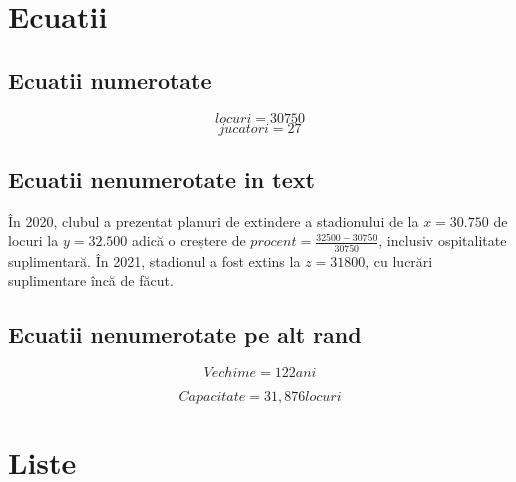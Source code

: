 \documentclass{article}
\begin{document}
\section{Ecuatii}
\subsection{Ecuatii numerotate}
\begin{equation}
    locuri =  30750
\end{equation}
\begin{equation}
    jucatori = 27
\end{equation}

\subsection{Ecuatii nenumerotate in text}
\hspace{0.5cm}În 2020, clubul a prezentat planuri de extindere a stadionului de la \( x=30.750 \) de locuri la \( y = 32.500 \) adică o creștere de \(procent =  \frac{32500 - 30750}{30750} \), inclusiv ospitalitate suplimentară. În 2021, stadionul a fost extins la \( z = 31800 \), cu lucrări suplimentare încă de făcut.


\subsection{Ecuatii nenumerotate pe alt rand}
\hspace{0.5cm}
\[
   Vechime = 122 ani
\]

\[
   Capacitate = 31,876 locuri
\]


\section{Liste}
\end{document}
